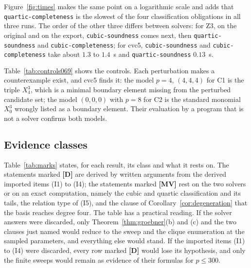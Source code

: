 \documentclass[11pt]{article}
\theoremstyle{definition}
\theoremstyle{remark}
\newcommand{\mD}{\textbf{[D]}}
\newcommand{\mMV}{\textbf{[MV]}}
\begin{document}
Figure~\ref{fig:times} makes the same point on a logarithmic scale and adds that
\texttt{quartic-completeness} is the slowest of the four classification obligations in all three
runs. The order of the other three differs between solvers: for Z3, on the original and on the
export, \texttt{cubic-soundness} comes next, then \texttt{quartic-soundness} and
\texttt{cubic-completeness}; for cvc5, \texttt{cubic-soundness} and \texttt{cubic-completeness}
take about $1.3$ to $1.4$~s and \texttt{quartic-soundness} $0.13$~s.

\begin{table}[ht]
\centering
\small
\resizebox{\textwidth}{!}{}
\caption{The four perturbed obligations of computation EXP-069. C1 removes $X_p^3$ from the cubic
candidates, C2 adds the triple $(0,0,0)$, C3 replaces the tail $(0,3p,10p)$ by $(0,3p,10p+1)$ and
C4 widens the quartic index range to include $i=1$. Both solvers answer satisfiable; the model of cvc5
satisfies the perturbed formula under an exact integer evaluator and fails the original obligation.}
\label{tab:controls069}
\end{table}

Table~\ref{tab:controls069} shows the controls. Each perturbation makes a counterexample
exist, and cvc5 finds it: the model $p=4$, $(4,4,4)$ for C1 is the triple $X_4^3$, which is a
minimal boundary element missing from the perturbed candidate set; the model $(0,0,0)$ with
$p=8$ for C2 is the standard monomial $X_0^3$ wrongly listed as a boundary element. Their
evaluation by a program that is not a solver confirms both models.

\subsection{Evidence classes}

Table~\ref{tab:marks} states, for each result, its class and what it rests on. The statements
marked \mD{} are derived by written arguments from the derived imported items (I1) to (I4); the
statements marked \mMV{} rest on the two solvers or on an exact computation, namely the cubic and
quartic classification and its tails, the relation type of (I5), and the clause of
Corollary~\ref{cor:degeneration} that the basis reaches degree four.
The table has a practical reading. If the solver answers were discarded, only Theorem~\ref{thm:groebner}(b)
and (c) and the two clauses just named would reduce to the sweep and the clique enumeration at the
sampled parameters, and everything else would stand. If the imported items (I1) to (I4) were
discarded, every row marked \mD{} would lose its hypothesis, and only the finite sweeps would
remain as evidence of their formulas for $p\leq300$.
\end{document}
